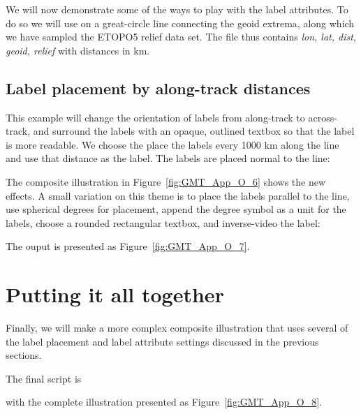 We will now demonstrate some of the ways to play with the label attributes.  To do so we
will use  on a great-circle line connecting the geoid extrema, along which
we have sampled the ETOPO5 relief data set.  The file  thus contains
{\it lon, lat, dist, geoid, relief} with distances in km.

\subsection{Label placement by along-track distances}

This example will change the orientation of labels from along-track to across-track, and
surround the labels with an opaque, outlined textbox so that the label is more readable.  We choose
the place the labels every 1000 km along the line and use that distance as the label.  The
labels are placed normal to the line:



The composite illustration in Figure~\ref{fig:GMT_App_O_6} shows the new effects.
A small variation on this theme is to place the labels parallel to the line, use
spherical degrees for placement, append the degree symbol as a unit for the
labels, choose a rounded rectangular textbox, and inverse-video the label:



The ouput is presented as Figure~\ref{fig:GMT_App_O_7}.

\section{Putting it all together}

Finally, we will make a more complex composite illustration that uses several of the
label placement and label attribute settings discussed in the previous sections.

The final script is



with the complete illustration presented as Figure~\ref{fig:GMT_App_O_8}.
